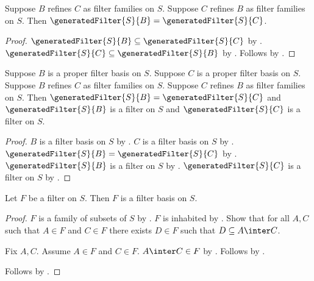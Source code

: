\begin{theorem}\label{mutual_filter_family_refinement_generated_filters_equal}
    Suppose $B$ refines $C$ as filter families on $S$.
    Suppose $C$ refines $B$ as filter families on $S$.
    Then $\generatedFilter{S}{B}=\generatedFilter{S}{C}$.
\end{theorem}
\begin{proof}
    $\generatedFilter{S}{B}\subseteq\generatedFilter{S}{C}$
        by .
    $\generatedFilter{S}{C}\subseteq\generatedFilter{S}{B}$
        by .
    Follows by .
\end{proof}

\begin{corollary}\label{mutual_proper_filter_basis_generated_filter}
    Suppose $B$ is a proper filter basis on $S$.
    Suppose $C$ is a proper filter basis on $S$.
    Suppose $B$ refines $C$ as filter families on $S$.
    Suppose $C$ refines $B$ as filter families on $S$.
    Then $\generatedFilter{S}{B}=\generatedFilter{S}{C}$ and
        $\generatedFilter{S}{B}$ is a filter on $S$ and
        $\generatedFilter{S}{C}$ is a filter on $S$.
\end{corollary}
\begin{proof}
    $B$ is a filter basis on $S$ by
        .
    $C$ is a filter basis on $S$ by
        .
    $\generatedFilter{S}{B}=\generatedFilter{S}{C}$
        by .
    $\generatedFilter{S}{B}$ is a filter on $S$
        by .
    $\generatedFilter{S}{C}$ is a filter on $S$
        by .
\end{proof}

\begin{proposition}\label{filter_is_filter_basis}
    Let $F$ be a filter on $S$.
    Then $F$ is a filter basis on $S$.
\end{proposition}
\begin{proof}
    $F$ is a family of subsets of $S$ by .
    $F$ is inhabited by .
    Show that for all $A,C$ such that $A\in F$ and $C\in F$
        there exists $D\in F$ such that $D\subseteq A\inter C$.
    \begin{subproof}
        Fix $A,C$.
        Assume $A\in F$ and $C\in F$.
        $A\inter C\in F$ by .
        Follows by .
    \end{subproof}
    Follows by .
\end{proof}

